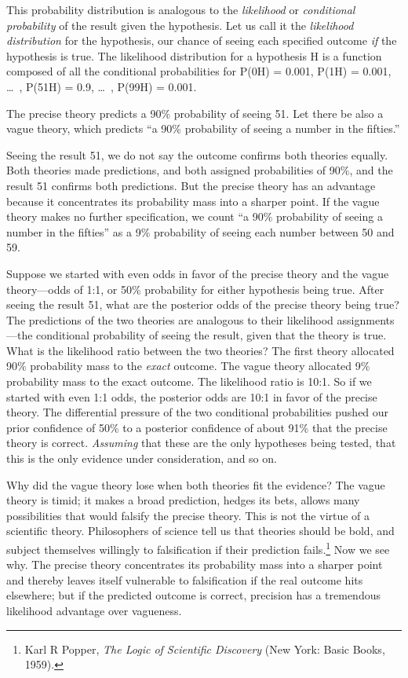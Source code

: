 {
 This probability distribution is analogous to the
\textit{likelihood} or \textit{conditional probability} of the result
given the hypothesis. Let us call it the \textit{likelihood
distribution} for the hypothesis, our chance of seeing each specified
outcome \textit{if} the hypothesis is true. The likelihood distribution
for a hypothesis H is a function composed of all the conditional
probabilities for P(0{\textbar}H) = 0.001, P(1{\textbar}H) = 0.001,
\ldots~, P(51{\textbar}H) = 0.9, \ldots~, P(99{\textbar}H) = 0.001.}

{
 The precise theory predicts a 90\% probability of seeing 51. Let
there be also a vague theory, which predicts ``a 90\%
probability of seeing a number in the fifties.''}

{
 Seeing the result 51, we do not say the outcome confirms both
theories equally. Both theories made predictions, and both assigned
probabilities of 90\%, and the result 51 confirms both predictions. But
the precise theory has an advantage because it concentrates its
probability mass into a sharper point. If the vague theory makes no
further specification, we count ``a 90\% probability
of seeing a number in the fifties'' as a 9\%
probability of seeing each number between 50 and 59.}

{
 Suppose we started with even odds in favor of the precise theory
and the vague theory---odds of 1:1, or 50\% probability for either
hypothesis being true. After seeing the result 51, what are the
posterior odds of the precise theory being true? The predictions of the
two theories are analogous to their likelihood assignments---the
conditional probability of seeing the result, given that the theory is
true. What is the likelihood ratio between the two theories? The first
theory allocated 90\% probability mass to the \textit{exact} outcome.
The vague theory allocated 9\% probability mass to the exact outcome.
The likelihood ratio is 10:1. So if we started with even 1:1 odds, the
posterior odds are 10:1 in favor of the precise theory. The
differential pressure of the two conditional probabilities pushed our
prior confidence of 50\% to a posterior confidence of about 91\% that
the precise theory is correct. \textit{Assuming} that these are the
only hypotheses being tested, that this is the only evidence under
consideration, and so on.}

{
 Why did the vague theory lose when both theories fit the evidence?
The vague theory is timid; it makes a broad prediction, hedges its
bets, allows many possibilities that would falsify the precise theory.
This is not the virtue of a scientific theory. Philosophers of science
tell us that theories should be bold, and subject themselves willingly
to falsification if their prediction fails.\footnote{Karl R Popper, \textit{The Logic of Scientific Discovery} (New
York: Basic Books, 1959).} Now we
see why. The precise theory concentrates its probability mass into a
sharper point and thereby leaves itself vulnerable to falsification if
the real outcome hits elsewhere; but if the predicted outcome is
correct, precision has a tremendous likelihood advantage over
vagueness.}

